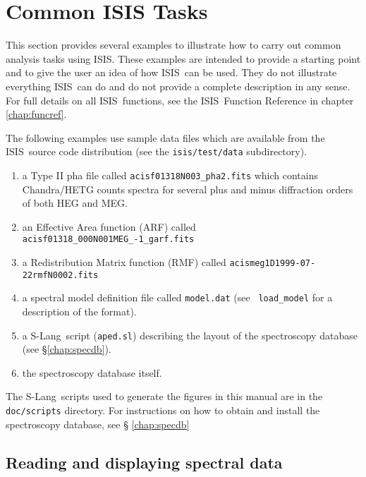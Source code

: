 \documentclass{book}
\newcommand{\isisx}{{\sc ISIS~}}
\newcommand{\isis}{{\sc ISIS}}
\newcommand{\slang}{{\sc S-Lang}}
\begin{document}
{\chapter{Common ISIS Tasks}
\label{chap:common-tasks}

This section provides several examples to illustrate how to carry out common
analysis tasks using \isis.  These examples are intended to provide a
starting point and to give the user an idea of how \isisx can be used.  They
do not illustrate everything \isisx can do and do not provide a complete
description in any sense.  For full details on all \isisx functions, see the
\isisx Function Reference in chapter \ref{chap:funcref}.

The following examples use sample data files which are
available from the \isisx source code distribution (see the
\verb|isis/test/data| subdirectory).
\begin{enumerate}

\item a Type II pha file called \verb|acisf01318N003_pha2.fits|
which contains Chandra/HETG counts spectra for several plus and
minus diffraction orders of both HEG and MEG.

\item an Effective Area function (ARF) called
\verb|acisf01318_000N001MEG_-1_garf.fits|

\item a Redistribution Matrix function (RMF) called
\verb|acismeg1D1999-07-22rmfN0002.fits|

\item a spectral model definition file called {\tt model.dat} (see {\tt
load\_model} for a description of the format).

\item a \slang{}ript ({\tt aped.sl}) describing the layout of the
spectroscopy database (see \S\ref{chap:specdb}).

\item the spectroscopy database itself.
\end{enumerate}

The \slang{}ripts used to generate the figures in this manual
are in the {\tt doc/scripts} directory. For instructions on
how to obtain and install the spectroscopy database, see \S
\ref{chap:specdb}

\section{Reading and displaying spectral data}

}
\end{document}
